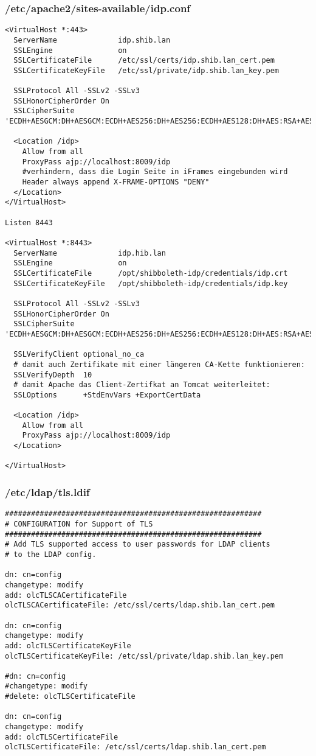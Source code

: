 \subsubsection{/etc/apache2/sites-available/idp.conf}
\begin{lstlisting}
<VirtualHost *:443>
  ServerName              idp.shib.lan
  SSLEngine               on
  SSLCertificateFile      /etc/ssl/certs/idp.shib.lan_cert.pem
  SSLCertificateKeyFile   /etc/ssl/private/idp.shib.lan_key.pem
 
  SSLProtocol All -SSLv2 -SSLv3
  SSLHonorCipherOrder On
  SSLCipherSuite 'ECDH+AESGCM:DH+AESGCM:ECDH+AES256:DH+AES256:ECDH+AES128:DH+AES:RSA+AESGCM:RSA+AES:ECDH+3DES:DH+3DES:RSA+3DES:!aNULL:!eNULL:!LOW:!RC4:!MD5:!EXP:!PSK:!DSS:!SEED:!ECDSA:!CAMELLIA'
 
  <Location /idp>
    Allow from all
    ProxyPass ajp://localhost:8009/idp
    #verhindern, dass die Login Seite in iFrames eingebunden wird
    Header always append X-FRAME-OPTIONS "DENY"
  </Location>
</VirtualHost>
 
Listen 8443
 
<VirtualHost *:8443>
  ServerName              idp.hib.lan
  SSLEngine               on
  SSLCertificateFile      /opt/shibboleth-idp/credentials/idp.crt
  SSLCertificateKeyFile   /opt/shibboleth-idp/credentials/idp.key

  SSLProtocol All -SSLv2 -SSLv3
  SSLHonorCipherOrder On
  SSLCipherSuite 'ECDH+AESGCM:DH+AESGCM:ECDH+AES256:DH+AES256:ECDH+AES128:DH+AES:RSA+AESGCM:RSA+AES:ECDH+3DES:DH+3DES:RSA+3DES:!aNULL:!eNULL:!LOW:!RC4:!MD5:!EXP:!PSK:!DSS:!SEED:!ECDSA:!CAMELLIA'
 
  SSLVerifyClient optional_no_ca
  # damit auch Zertifikate mit einer längeren CA-Kette funktionieren:
  SSLVerifyDepth  10
  # damit Apache das Client-Zertifkat an Tomcat weiterleitet:
  SSLOptions      +StdEnvVars +ExportCertData
 
  <Location /idp>
    Allow from all
    ProxyPass ajp://localhost:8009/idp
  </Location>
 
</VirtualHost>
\end{lstlisting}
\subsubsection{/etc/ldap/tls.ldif}
\begin{lstlisting}
###########################################################
# CONFIGURATION for Support of TLS
###########################################################
# Add TLS supported access to user passwords for LDAP clients
# to the LDAP config. 

dn: cn=config
changetype: modify
add: olcTLSCACertificateFile
olcTLSCACertificateFile: /etc/ssl/certs/ldap.shib.lan_cert.pem

dn: cn=config
changetype: modify
add: olcTLSCertificateKeyFile
olcTLSCertificateKeyFile: /etc/ssl/private/ldap.shib.lan_key.pem

#dn: cn=config
#changetype: modify
#delete: olcTLSCertificateFile

dn: cn=config
changetype: modify
add: olcTLSCertificateFile
olcTLSCertificateFile: /etc/ssl/certs/ldap.shib.lan_cert.pem
\end{lstlisting}

